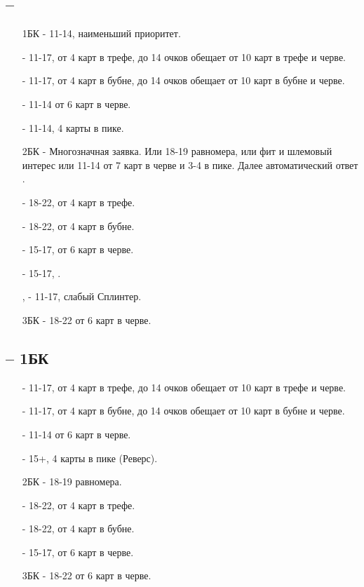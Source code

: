 \documentclass{article}
\begin{document}
\subsection{ -- }
\begin{enumerate}
    \item[1БК] - 11-14, наименьший приоритет.
    \item[\cl{2}] - 11-17, от 4 карт в трефе, до 14 очков обещает от 10 карт в трефе и черве. 
    \item[\di{2}] - 11-17, от 4 карт в бубне, до 14 очков обещает от 10 карт в бубне и черве. 
    \item[\he{2}] - 11-14 от 6 карт в черве.
    \item[\sp{2}] - 11-14, 4 карты в пике.
    \item[2БК] - Многозначная заявка. Или 18-19 равномера, или фит и шлемовый интерес или 11-14 от 7 карт в черве и 3-4 в пике. Далее автоматический ответ .
    \item[\cl{3}] - 18-22, от 4 карт в трефе.
    \item[\di{3}] - 18-22, от 4 карт в бубне.
    \item[\he{3}] - 15-17, от 6 карт в черве.
    \item[\sp{3}] - 15-17, .
    \item[\cl{4}, \di{4}] - 11-17, слабый Сплинтер.
    \item[3БК] - 18-22 от 6 карт в черве.
\end{enumerate}
\subsection{ -- 1БК}
\begin{enumerate}
    \item[\cl{2}] - 11-17, от 4 карт в трефе, до 14 очков обещает от 10 карт в трефе и черве. 
    \item[\di{2}] - 11-17, от 4 карт в бубне, до 14 очков обещает от 10 карт в бубне и черве. 
    \item[\he{2}] - 11-14 от 6 карт в черве.
    \item[\sp{2}] - 15+, 4 карты в пике (Реверс).
    \item[2БК] - 18-19 равномера.
    \item[\cl{3}] - 18-22, от 4 карт в трефе.
    \item[\di{3}] - 18-22, от 4 карт в бубне.
    \item[\he{3}] - 15-17, от 6 карт в черве.
    \item[3БК] - 18-22 от 6 карт в черве.
\end{enumerate}
\end{document}
